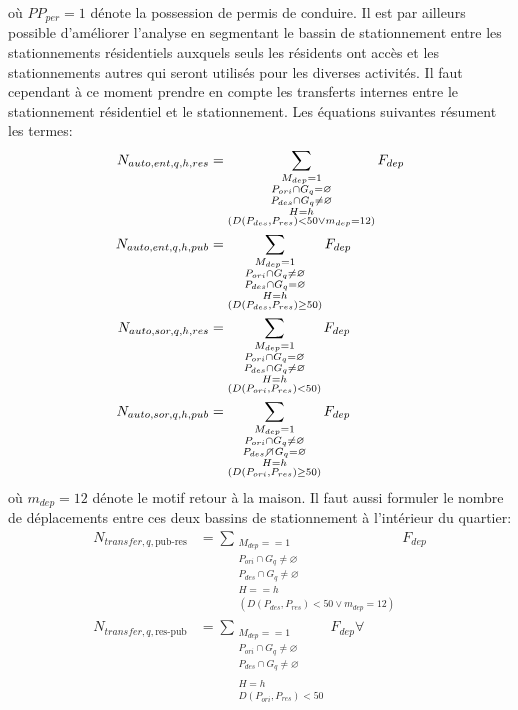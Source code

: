                 où $PP_{per} = 1$ dénote la possession de permis de conduire. 
                Il est par ailleurs possible d'améliorer l'analyse en segmentant le bassin de stationnement entre les stationnements résidentiels auxquels seuls les résidents ont accès et les stationnements autres qui seront utilisés pour les diverses activités. Il faut cependant à ce moment prendre en compte les transferts internes entre le stationnement résidentiel et le stationnement. Les équations suivantes résument les termes: 
                \begin{align}
                    N_{auto,ent,q,h,res} &= \sum_{\substack{M_{dep} = 1 \\ P_{ori} \cap G_q =\varnothing \\ P_{des} \cap G_q \neq\varnothing \\ H=h \\ (D(P_{des},P_{res})<50 \lor m_{dep}=12)}}{F_{dep}}\\
                     N_{auto,ent,q,h,pub} &= \sum_{\substack{M_{dep} = 1 \\ P_{ori} \cap G_q\neq\varnothing \\ P_{des} \cap G_q =\varnothing \\ H=h \\ (D(P_{des},P_{res})\geq50)}}{F_{dep}}\\
                     N_{auto,sor,q,h,res} &= \sum_{\substack{M_{dep} = 1 \\ P_{ori} \cap G_q =\varnothing\\ P_{des} \cap G_q \neq\varnothing \\  H=h \\ (D(P_{ori},P_{res})<50)}}{F_{dep}} \\
                     N_{auto,sor,q,h,pub} &= \sum_{\substack{M_{dep} = 1 \\ P_{ori} \cap G_q \neq\varnothing\\ P_{des} \disjoint G_q =\varnothing \\  H=h \\ (D(P_{ori},P_{res})\geq50)}}F_{dep} 
                \end{align}
                où $m_{dep}=12 $ dénote le motif retour à la maison. Il faut aussi formuler le nombre de déplacements entre ces deux bassins de stationnement à l'intérieur du quartier:
                \begin{align}
                    N_{transfer,q,\text{pub-res}} & = \sum_{\substack{M_{dep}  == 1  \\ P_{ori} \cap G_q\neq\varnothing \\ P_{des} \cap G_q \neq\varnothing \\ H==h \\ (D(P_{des},P_{res})<50 \lor m_{dep}=12)}}{F_{dep}}\\
                     N_{transfer,q,\text{res-pub}} & = \sum_{\substack{M_{dep}  == 1  \\ P_{ori} \cap G_q \neq\varnothing\\ P_{des} \cap G_q\neq\varnothing  \\ 
                    \\ H=h \\ D(P_{ori},P_{res})<50 }}{F_{dep}}\forall 
                \end{align}
